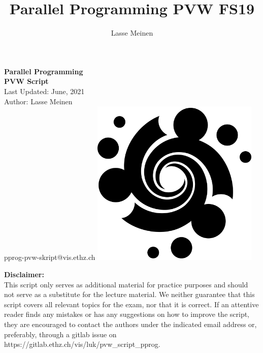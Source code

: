 \documentclass[titlepage, dvipsnames]{article}
\title{Parallel Programming PVW FS19}
\author{Lasse Meinen}
\theoremstyle{plain}
\theoremstyle{remark}
\theoremstyle{definition}
\begin{document}
    \renewcommand{\figurename}{Fig.}
    \renewcommand{\contentsname}{Table of Contents}
    \renewcommand{\thesubfigure}{\roman{subfigure}}
    
    \renewcommand{\ExerciseHeaderTitle}{\ExerciseTitle}
    \renewcommand{\ExerciseHeader}{\centerline{\textbf{\large\ExerciseName\ExerciseHeaderNB\ExerciseHeaderTitle\ExerciseHeaderOrigin}}\\}
    \renewcommand{\ExerciseListHeader}{\ExerciseHeaderDifficulty%
    \textbf{\ExerciseHeaderNB .%
    \ \ExerciseHeaderTitle \newline}%
    \ExerciseHeaderOrigin\ignorespaces}
    \renewcommand{\AnswerListHeader}{\textbf{\ExerciseHeaderNB. \ \ExerciseHeaderTitle}}
    \setlength{\Exesep}{1\baselineskip}    
    \setlength{\QuestionBefore}{.2em}
    \setlength{\QuestionIndent}{2em}
    
    \makeatletter 
        \begin{titlepage}
		\begin{center} 
		\huge \textbf{Parallel Programming \\ PVW Script}
		\\ \bigskip
		\Large Last Updated: June, 2021
		\\ \bigskip
		\large Author: Lasse Meinen
		\\ \bigskip
		\Large pprog-pvw-skript@vis.ethz.ch
		\vfill
		{\includegraphics[width = 0.6\textwidth]{images/spirale_black1000x1000.png}}
		\vfill
		\end{center}

		\noindent \textbf{Disclaimer:}\\
		This  script only serves as additional material for practice purposes and should not serve as a substitute for the lecture material. We neither guarantee that this script covers all relevant topics for the exam, nor that it is correct. If an attentive reader finds any mistakes or has any suggestions on how to improve the script, they are encouraged to contact the authors under the
		indicated email address or, preferably, through a gitlab issue on https://gitlab.ethz.ch/vis/luk/pvw\_script\_pprog.
	\end{titlepage}
    \makeatother
    \thispagestyle{empty}
    \newpage
\end{document}
